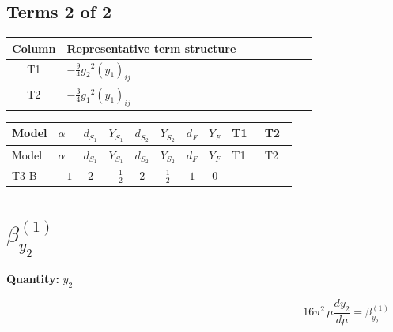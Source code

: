 \documentclass[8pt]{article}
\begin{document}
\begin{landscape}
\subsection*{Terms 2 of 2}
\begin{center}
\begin{tabular}{@{}c >{\raggedright\arraybackslash}p{0.82\linewidth}@{}}
\toprule
Column & Representative term structure \\
\midrule
T1 & \(\displaystyle -\frac{9}{4} {g_2}^2 \left({y_1}\right)_{ij}\) \\
\midrule
T2 & \(\displaystyle -\frac{3}{4} {g_1}^2 \left({y_1}\right)_{ij}\) \\
\midrule
\bottomrule
\end{tabular}
\end{center}
\smallskip
\tiny
\begin{longtable}{@{}llcccccc >{\raggedright\arraybackslash}p{0.21\linewidth} >{\raggedright\arraybackslash}p{0.21\linewidth}@{}}
\toprule
Model & $\alpha$ & $d_{S_1}$ & $Y_{S_1}$ & $d_{S_2}$ & $Y_{S_2}$ & $d_F$ & $Y_F$ & T1 & T2 \\
\midrule
\endfirsthead
\toprule
Model & $\alpha$ & $d_{S_1}$ & $Y_{S_1}$ & $d_{S_2}$ & $Y_{S_2}$ & $d_F$ & $Y_F$ & T1 & T2 \\
\midrule
\endhead
T3-B & $-1$ & $2$ & $-\frac{1}{2}$ & $2$ & $\frac{1}{2}$ & $1$ & $0$ & \scriptsize\adjustbox{max width=\linewidth}{$\begin{gathered} -\frac{9}{4} {g_2}^2 \left({y_1}\right)_{ij}\end{gathered}$} & \scriptsize\adjustbox{max width=\linewidth}{$\begin{gathered} -\frac{3}{4} {g_1}^2 \left({y_1}\right)_{ij}\end{gathered}$} \\
\midrule
\bottomrule
\end{longtable}
\clearpage
\section*{$\beta_{y_2}^{(1)}$}
\noindent\textbf{Quantity: }$y_2$\par\smallskip
\[16\pi^2\,\mu\frac{d y_2}{d\mu}=\beta_{y_2}^{(1)}\]

\end{landscape}
\end{document}
